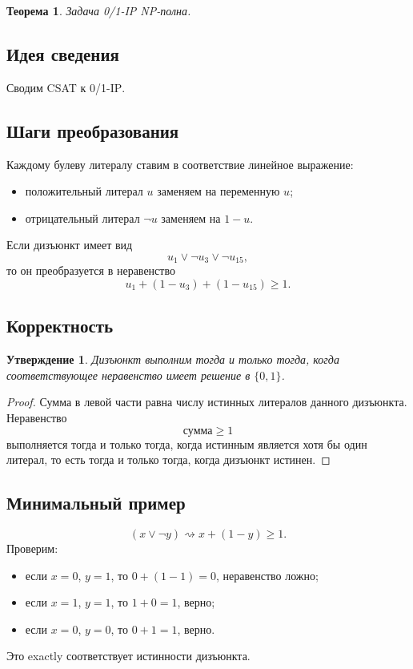 \documentclass[12pt,a4paper]{article}
\theoremstyle{definition}
\theoremstyle{plain}
\newtheorem{theorem}{Теорема}[section]
\newtheorem{proposition}{Утверждение}[section]
\begin{document}
\begin{theorem}
Задача \textsc{0/1-IP} NP-полна.
\end{theorem}

\subsection{Идея сведения}
Сводим \textsc{CSAT} к \textsc{0/1-IP}.

\subsection{Шаги преобразования}
Каждому булеву литералу ставим в соответствие линейное выражение:
\begin{itemize}
\item положительный литерал $u$ заменяем на переменную $u$;
\item отрицательный литерал $\neg u$ заменяем на $1-u$.
\end{itemize}

Если дизъюнкт имеет вид
\[
u_1\vee \neg u_3\vee \neg u_{15},
\]
то он преобразуется в неравенство
\[
u_1+(1-u_3)+(1-u_{15})\ge 1.
\]

\subsection{Корректность}
\begin{proposition}
Дизъюнкт выполним тогда и только тогда, когда соответствующее неравенство имеет решение в $\{0,1\}$.
\end{proposition}

\begin{proof}
Сумма в левой части равна числу истинных литералов данного дизъюнкта. Неравенство
\[
\text{сумма}\ge 1
\]
выполняется тогда и только тогда, когда истинным является хотя бы один литерал, то есть тогда и только тогда, когда дизъюнкт истинен.
\end{proof}

\subsection{Минимальный пример}
\[
(x\vee \neg y)\rightsquigarrow x+(1-y)\ge 1.
\]
Проверим:
\begin{itemize}
\item если $x=0$, $y=1$, то $0+(1-1)=0$, неравенство ложно;
\item если $x=1$, $y=1$, то $1+0=1$, верно;
\item если $x=0$, $y=0$, то $0+1=1$, верно.
\end{itemize}
Это exactly соответствует истинности дизъюнкта.
\end{document}

